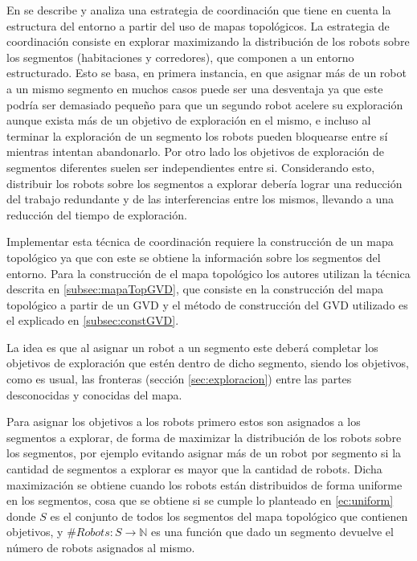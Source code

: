 En \cite{wurm2008coordinated} se describe y analiza una estrategia de
coordinación que tiene en cuenta la estructura del entorno a partir del uso de
mapas topológicos. La estrategia de coordinación consiste en explorar
maximizando la distribución de los robots sobre los segmentos (habitaciones y
corredores), que componen a un entorno estructurado. Esto se basa, en primera
instancia, en que asignar más de un robot a un mismo segmento en muchos casos
puede ser una desventaja ya que este podría ser demasiado pequeño para que un
segundo robot acelere su exploración aunque exista más de un objetivo de
exploración en el mismo, e incluso al terminar la exploración de un segmento
los robots pueden bloquearse entre sí mientras intentan abandonarlo. Por otro
lado los objetivos de exploración de segmentos diferentes suelen ser
independientes entre si. Considerando esto, distribuir los robots sobre los
segmentos a explorar debería lograr una reducción del trabajo redundante y de
las interferencias entre los mismos, llevando a una reducción del tiempo de
exploración.

Implementar esta técnica de coordinación requiere la construcción de un mapa topológico ya que con este se obtiene la información sobre los segmentos del entorno. Para la construcción de el mapa topológico los autores utilizan la técnica descrita en \ref{subsec:mapaTopGVD}, que consiste en la construcción del mapa topológico a partir de un GVD y el método de construcción del GVD utilizado es el explicado en \ref{subsec:constGVD}.

La idea es que al asignar un robot a un segmento este deberá completar los objetivos de exploración que estén dentro de dicho segmento, siendo los objetivos, como es usual, las fronteras (sección \ref{sec:exploracion}) entre las partes desconocidas y conocidas del mapa. 

Para asignar los objetivos a los robots primero estos son asignados a los
segmentos a explorar, de forma de maximizar la distribución de los robots sobre
los segmentos, por ejemplo evitando asignar más de un robot por segmento si la
cantidad de segmentos a explorar es mayor que la cantidad de robots. Dicha
maximización se obtiene cuando los robots están distribuidos de forma uniforme
en los segmentos, cosa que se obtiene si se cumple lo planteado en
\eqref{ec:uniform} donde $S$ es el conjunto de todos los segmentos del mapa
topológico que contienen objetivos, y $\#Robots : S \rightarrow \mathds{N}$ es
una función que dado un segmento devuelve el número de robots asignados al
mismo. 

